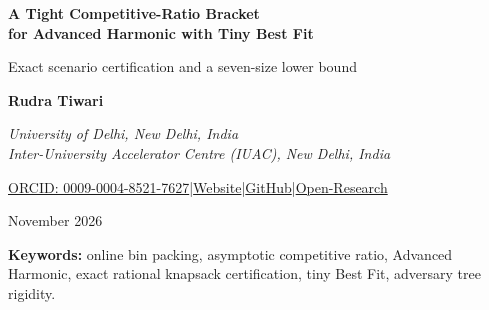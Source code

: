 \documentclass[11pt,letterpaper]{article}
\theoremstyle{definition}
\theoremstyle{remark}
\begin{document}
\thispagestyle{empty}
\begin{center}
\vspace*{0.22in}
{\LARGE\bfseries A Tight Competitive-Ratio Bracket\\[.14em] for Advanced Harmonic with Tiny Best Fit\par}
\vspace{0.20in}
{\large Exact scenario certification and a seven-size lower bound\par}
\vspace{0.24in}
{\normalsize\bfseries Rudra Tiwari\par}
\vspace{0.03in}
{\normalsize\itshape University of Delhi, New Delhi, India\\Inter-University Accelerator Centre (IUAC), New Delhi, India\par}
\vspace{0.10in}
{\small\href{https://orcid.org/0009-0004-8521-7627}{ORCID: 0009-0004-8521-7627}\quad|\quad\href{https://rtx09x.github.io/}{Website}\quad|\quad\href{https://github.com/Rtx09x}{GitHub}\quad|\quad\href{https://github.com/Rtx09x/Open-Research/tree/main/computer-science/online-bin-packing}{Open-Research}\par}
\vspace{0.15in}
{\normalsize November 2026\par}
\end{center}
\vspace{0.16in}
\begin{abstract}
We give an all-input upper bound and a seven-size lower bound for the same deterministic online bin packing algorithm, a retuned Advanced Harmonic variant using Best Fit over all advertised tiny containers. Its asymptotic competitive ratio lies between $1.5782054112079646\dots$ and $1.5782055179987482\dots$, a width of $1.068\times10^{-7}$. The upper bound combines chronological charging over the suffix of tiny-container creations with two revised small-class proportions and exact pricing of 804 strict knapsacks across 402 scenarios. The lower bound uses fixed rational item sizes and an offline optimum of exactly $N$ bins for each batch multiplicity $N$, then counts the positive containers the online algorithm must create. The upper endpoint is numerically below Martin's concurrent $1.5782147437$ bound for a separately tuned Advanced Harmonic variant. We also give exact upper certificates for two precursor variants and causal counterstrategies against three restricted extensions of the 2018 lower-bound adversary.
\end{abstract}
\vspace{0.10in}
\noindent\textbf{Keywords:} online bin packing, asymptotic competitive ratio, Advanced Harmonic, exact rational knapsack certification, tiny Best Fit, adversary tree rigidity.
\clearpage
\tableofcontents
\clearpage
\end{document}
